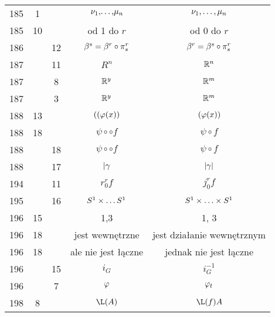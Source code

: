 \documentclass[a4paper,11pt]{article}
\begin{document}
\begin{center}
\begin{tabular}{|c|c|c|c|c|}
    185 &  1 & & $\nu_{ 1 },\!\ldots,\! \mu_{ n }$
           & $\nu_{ 1 }, \ldots, \mu_{ n }$ \\
    185 & 10 & & od 1 do $r$ & od 0 do $r$ \\
    186 & & 12 & $\beta^{ s } = \beta^{ r } \circ \pi^{ r }_{ s }$
           & $\beta^{ r } = \beta^{ s } \circ \pi^{ r }_{ s }$ \\
    187 & & 11 & $R^{ n }$ & $\mathbb{R}^{ n }$ \\
    187 & &  8 & $\mathbb{R}^{ y }$ & $\mathbb{R}^{ m }$ \\
    187 & &  3 & $\mathbb{R}^{ y }$ & $\mathbb{R}^{ m }$ \\
    188 & 13 & & $( ( \varphi( x ) )$ & $( \varphi( x ) )$ \\
    188 & 18 & & $\psi \circ \circ f$ & $\psi \circ f$ \\
    188 & & 18 & $\psi \circ \circ f$ & $\psi \circ f$ \\
    188 & & 17 & $| \gamma$ & $| \gamma |$ \\
    194 & & 11 & $r^{ r }_{ 0 }f$ & $j^{ r }_{ 0 }f$ \\
    195 & & 16 & $S^{ 1 } \times \ldots S^{ 1 }$ & $S^{ 1 } \times \ldots \times S^{ 1 }$ \\
    196 & 15 & & 1,3 & 1, 3 \\
    196 & 18 & & jest wewnętrzne & jest działanie wewnętrznym \\
    196 & 18 & & ale nie jest łączne & jednak nie jest łączne \\
    196 & & 15 & $i_{ G }$ & $i_{ G }^{ -1 }$ \\
    196 & &  7 & $\varphi$ & $\varphi_{ t }$ \\
    198 & 8 & & $\L( A )$ & $\L( f )A$ \\
    \hline
  \end{tabular}


\end{center}
\end{document}
